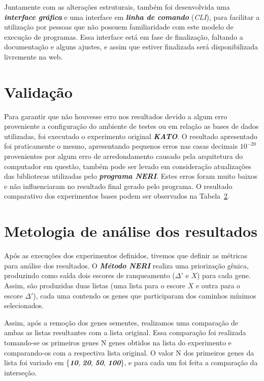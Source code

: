 %
Juntamente com as alterações estruturais, também foi desenvolvida uma \textsl{\textbf{interface gráfica}} e uma interface em \textsl{\textbf{linha de comando}} (\textsl{CLI}), para facilitar a utilização por pessoas que não possuem familiaridade com este modelo de execução de programas.
Essa interface está em fase de finalização, faltando a documentação e alguns ajustes, e assim que estiver finalizada será disponibilizada livremente na web.

\section{Validação}
%
Para garantir que não houvesse erro nos resultados devido a algum erro proveniente a configuração do ambiente de testes ou em relação as bases de dados utilizadas, foi executado o experimento original \textsl{\textbf{KATO}}. O resultado apresentado foi praticamente o mesmo, apresentando pequenos erros nas casas decimais \textsl{\textbf{$10^{-20}$}} provenientes por algum erro de arredondamento causado pela arquitetura do computador em questão, também pode ser levado em consideração atualizações das bibliotecas utilizadas pelo \textsl{\textbf{programa NERI}}. Estes erros foram muito baixos e não influenciaram no resultado final gerado pelo programa. O resultado comparativo dos experimentos bases podem ser observados na Tabela~\ref{}.

\section{Metologia de análise dos resultados}

Após as execuções dos experimentos definidos, tivemos que definir as métricas para análise dos resultados.
O \textsl{\textbf{Método NERI}} realiza uma priorização gênica, produzindo como saída dois escores de ranqueamento ($\Delta'$ e $X$) para cada gene.
Assim, são produzidas duas listas (uma lista para o escore $X$ e outra para o escore $\Delta'$), cada uma contendo os genes que participaram dos caminhos mínimos selecionados. 

Assim, após a remoção dos genes sementes, realizamos uma comparação de ambas as listas resultantes com a lista original.
Essa comparação foi realizada tomando-se os primeiros genes N genes obtidos na lista do experimento e comparando-os com a respectiva lista original.
O valor N dos primeiros genes da lista foi variado em \{\textsl{\textbf{10}}, \textsl{\textbf{20}}, \textsl{\textbf{50}}, \textsl{\textbf{100}}\}, e para cada um foi feita a comparação da interseção.


